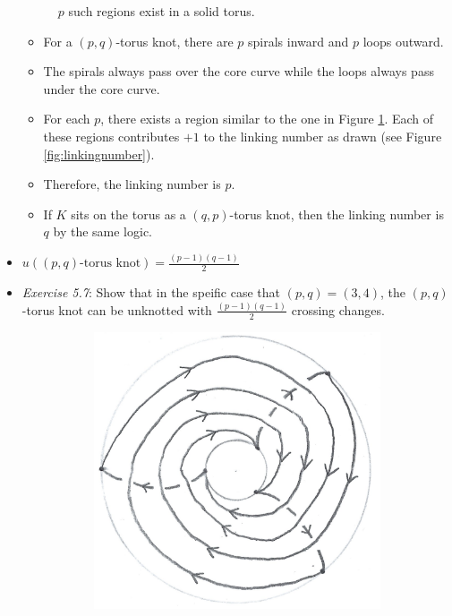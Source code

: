 \documentclass[titlepage]{article}
\numberwithin{figure}{section}
\numberwithin{table}{section}
\numberwithin{equation}{section}
\begin{document}
\begin{itemize}
\begin{figure}[h!]
        \caption{$p$ such regions exist in a solid torus.}
        \label{fig:ex5-5}
    \end{figure}
    \begin{itemize}
        \item For a $(p,q)$-torus knot, there are $p$ spirals inward and $p$ loops outward.
        \item The spirals always pass over the core curve while the loops always pass under the core curve.
        \item For each $p$, there exists a region similar to the one in Figure \ref{fig:ex5-5}. Each of these regions contributes $+1$ to the linking number as drawn (see Figure \ref{fig:linkingnumber}).
        \item Therefore, the linking number is $p$.
        \item If $K$ sits on the torus as a $(q,p)$-torus knot, then the linking number is $q$ by the same logic.
    \end{itemize}
    \item $u\left( (p,q)\text{-torus knot} \right)=\frac{(p-1)(q-1)}{2}$
    \item \emph{Exercise 5.7}: Show that in the speific case that $(p,q)=(3,4)$, the $(p,q)$-torus knot can be unknotted with $\frac{(p-1)(q-1)}{2}$ crossing changes.
    \begin{figure}[h!]
        \centering
        \begin{subfigure}[b]{0.3\linewidth}
            \centering
            \includegraphics[width=\linewidth]{Blender/ex5-7a.png}

\end{subfigure}
\end{figure}
\end{itemize}
\end{document}
